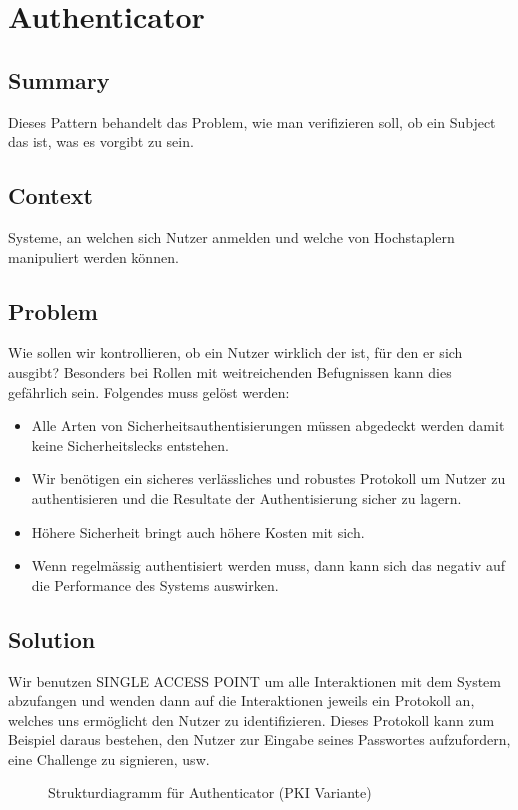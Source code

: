 \chapter{Authenticator}

\section{Summary}
Dieses Pattern behandelt das Problem, wie man verifizieren soll, ob ein Subject das ist, was es vorgibt zu sein.

\section{Context}
Systeme, an welchen sich Nutzer anmelden und welche von Hochstaplern manipuliert werden können.

\section{Problem}
Wie sollen wir kontrollieren, ob ein Nutzer wirklich der ist, für den er sich ausgibt? Besonders bei Rollen mit weitreichenden Befugnissen kann dies gefährlich sein. Folgendes muss gelöst werden:
\begin{itemize}
  \item Alle Arten von Sicherheitsauthentisierungen müssen abgedeckt werden damit keine Sicherheitslecks entstehen.
  \item Wir benötigen ein sicheres verlässliches und robustes Protokoll um Nutzer zu authentisieren und die Resultate der Authentisierung sicher zu lagern.
  \item Höhere Sicherheit bringt auch höhere Kosten mit sich.
  \item Wenn regelmässig authentisiert werden muss, dann kann sich das negativ auf die Performance des Systems auswirken.
\end{itemize}

\section{Solution}
Wir benutzen SINGLE ACCESS POINT um alle Interaktionen mit dem System abzufangen und wenden dann auf die Interaktionen jeweils ein Protokoll an, welches uns ermöglicht den Nutzer zu identifizieren. Dieses Protokoll kann zum Beispiel daraus bestehen, den Nutzer zur Eingabe seines Passwortes aufzufordern, eine Challenge zu signieren, usw.

\begin{figure}[H]
  \centering
  
  \caption{Strukturdiagramm f\"ur Authenticator (PKI Variante)}
\end{figure}


